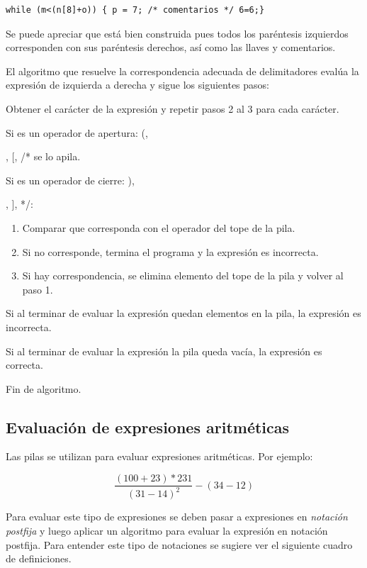 \begin{lstlisting}[numbers=none]
while (m<(n[8]+o)) { p = 7; /* comentarios */ 6=6;}
\end{lstlisting}

Se puede apreciar que está bien construida pues todos los paréntesis izquierdos corresponden con sus paréntesis derechos, así como las llaves y comentarios. 

El algoritmo que resuelve la correspondencia adecuada de delimitadores evalúa la expresión de izquierda a derecha y sigue los siguientes pasos: 

\begin{enumerate}
	
\item Obtener el carácter de la expresión y repetir pasos 2 al 3 para cada carácter.
\item Si es un operador de apertura:  (,  {, [, /*   se lo apila.
\item Si es un operador de cierre: ), }, ], */:
	\begin{enumerate}
		\item Comparar que corresponda con el operador del tope de la pila. 
		\item Si no corresponde, termina el programa y la expresión es incorrecta.
		\item Si hay correspondencia, se elimina elemento del tope de la pila y volver al paso 1.
\end{enumerate}	
\item Si al terminar de evaluar la expresión quedan elementos en la pila, la expresión es incorrecta.
\item Si al terminar de evaluar la expresión la pila queda vacía, la expresión es correcta. 
\item Fin de algoritmo.
\end{enumerate}	

\subsection{Evaluación de expresiones aritméticas}
Las pilas se utilizan para evaluar expresiones aritméticas. Por ejemplo:

\begin{equation*}
	\frac{(100+23)\ast 231}{(31-14)^2}-(34 - 12)
\end{equation*}


Para evaluar este tipo de expresiones se deben pasar a expresiones en \textit{notación postfija} y luego aplicar un algoritmo para evaluar la expresión en notación postfija. Para entender este tipo de notaciones se sugiere ver el siguiente cuadro de definiciones.

